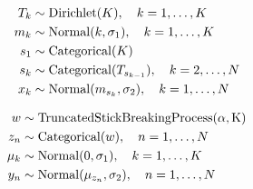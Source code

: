 \begin{equation}
  \label{eq:hmm}
  \begin{aligned}
    T_{k} &\sim \mathrm{Dirichlet}(K), \quad k = 1, \ldots, K \\
    m_{k} &\sim \mathrm{Normal}(k, \sigma_{1}), \quad k = 1, \ldots, K \\
    s_{1} &\sim \mathrm{Categorical}(K) \\
    s_{k} &\sim \mathrm{Categorical}(T_{s_{k-1}}), \quad k = 2, \ldots, N \\
    x_{k} &\sim \mathrm{Normal}(m_{s_{k}}, \sigma_{2}), \quad k = 1, \ldots, N
  \end{aligned}
\end{equation}

\begin{equation}
  \label{eq:imm}
  \begin{aligned}
    w &\sim \mathrm{TruncatedStickBreakingProcess(\alpha, K)} \\
    z_{n} &\sim \mathrm{Categorical}(w), \quad n = 1, \ldots, N \\
    \mu_{k} &\sim \mathrm{Normal}(0, \sigma_{1}), \quad k = 1, \ldots, K \\
    y_{n} &\sim \mathrm{Normal}(\mu_{z_{n}}, \sigma_{2}), \quad n = 1, \ldots, N
  \end{aligned}
\end{equation}








